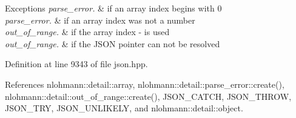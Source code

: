 \begin{DoxyExceptions}{Exceptions}
{\em parse\+\_\+error.} & if an array index begins with \textquotesingle{}0\textquotesingle{} \\
\hline
{\em parse\+\_\+error.} & if an array index was not a number \\
\hline
{\em out\+\_\+of\+\_\+range.} & if the array index \textquotesingle{}-\/\textquotesingle{} is used \\
\hline
{\em out\+\_\+of\+\_\+range.} & if the J\+S\+ON pointer can not be resolved \\
\hline
\end{DoxyExceptions}


Definition at line 9343 of file json.\+hpp.



References nlohmann\+::detail\+::array, nlohmann\+::detail\+::parse\+\_\+error\+::create(), nlohmann\+::detail\+::out\+\_\+of\+\_\+range\+::create(), J\+S\+O\+N\+\_\+\+C\+A\+T\+CH, J\+S\+O\+N\+\_\+\+T\+H\+R\+OW, J\+S\+O\+N\+\_\+\+T\+RY, J\+S\+O\+N\+\_\+\+U\+N\+L\+I\+K\+E\+LY, and nlohmann\+::detail\+::object.


